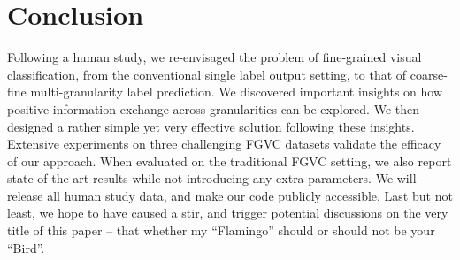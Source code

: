 \documentclass[final]{cvpr}
\begin{document}
\section{Conclusion}
Following a human study, we re-envisaged the problem of fine-grained visual classification, from the conventional single label output setting, to that of coarse-fine multi-granularity label prediction. We discovered important insights on how positive information exchange across granularities can be explored. We then designed a rather simple yet very effective solution following these insights. Extensive experiments on three challenging FGVC datasets validate the efficacy of our approach. When evaluated on the traditional FGVC setting, we also report state-of-the-art results while not introducing any extra parameters. We will release all human study data, and make our code publicly accessible. Last but not least, we hope to have caused a stir, and trigger potential discussions on the very title of this paper -- that whether my ``Flamingo'' should or should not be your ``Bird''. 


{\small


}

\end{document}
